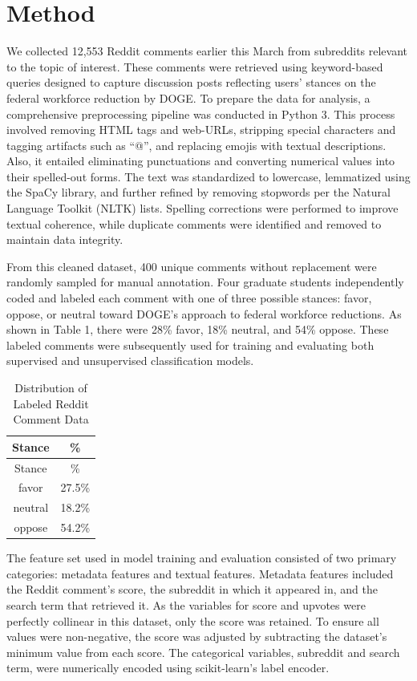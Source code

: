 \documentclass[
  12pt]{article}
\begin{document}
\section{Method}\label{sec-meth}

We collected 12,553 Reddit comments earlier this March from subreddits
relevant to the topic of interest. These comments were retrieved using
keyword-based queries designed to capture discussion posts reflecting
users' stances on the federal workforce reduction by DOGE. To prepare
the data for analysis, a comprehensive preprocessing pipeline was
conducted in Python 3. This process involved removing HTML tags and
web-URLs, stripping special characters and tagging artifacts such as
``@'', and replacing emojis with textual descriptions. Also, it entailed
eliminating punctuations and converting numerical values into their
spelled-out forms. The text was standardized to lowercase, lemmatized
using the SpaCy library, and further refined by removing stopwords per
the Natural Language Toolkit (NLTK) lists. Spelling corrections were
performed to improve textual coherence, while duplicate comments were
identified and removed to maintain data integrity.

From this cleaned dataset, 400 unique comments without replacement were
randomly sampled for manual annotation. Four graduate students
independently coded and labeled each comment with one of three possible
stances: favor, oppose, or neutral toward DOGE's approach to federal
workforce reductions. As shown in Table 1, there were 28\% favor, 18\%
neutral, and 54\% oppose. These labeled comments were subsequently used
for training and evaluating both supervised and unsupervised
classification models.

\begin{longtable}[]{@{}cc@{}}
\caption{Distribution of Labeled Reddit Comment Data}\tabularnewline
\toprule\noalign{}
Stance & \% \\
\midrule\noalign{}
\endfirsthead
\toprule\noalign{}
Stance & \% \\
\midrule\noalign{}
\endhead
\bottomrule\noalign{}
\endlastfoot
favor & 27.5\% \\
neutral & 18.2\% \\
oppose & 54.2\% \\
\end{longtable}

The feature set used in model training and evaluation consisted of two
primary categories: metadata features and textual features. Metadata
features included the Reddit comment's score, the subreddit in which it
appeared in, and the search term that retrieved it. As the variables for
score and upvotes were perfectly collinear in this dataset, only the
score was retained. To ensure all values were non-negative, the score
was adjusted by subtracting the dataset's minimum value from each score.
The categorical variables, subreddit and search term, were numerically
encoded using scikit-learn's label encoder.
\end{document}
